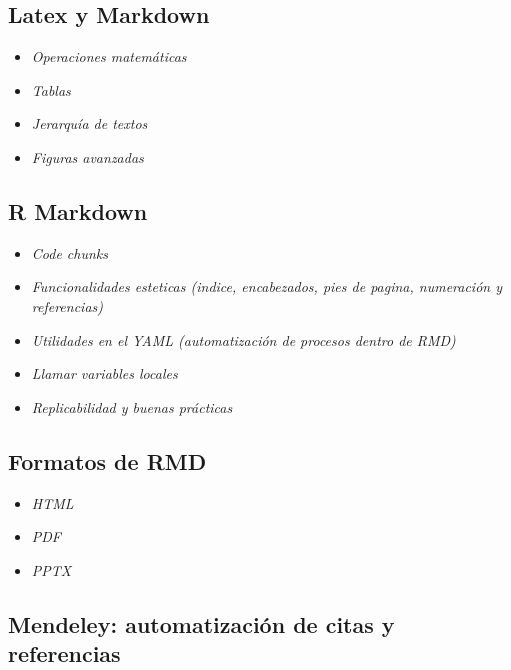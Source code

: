 \documentclass[11pt,]{article}
\begin{document}
\hypertarget{latex-y-markdown}{%
\subsection{Latex y Markdown}\label{latex-y-markdown}}

\begin{itemize}
\item
  \emph{Operaciones matemáticas}
\item
  \emph{Tablas}
\item
  \emph{Jerarquía de textos}
\item
  \emph{Figuras avanzadas}
\end{itemize}

\hypertarget{r-markdown}{%
\subsection{R Markdown}\label{r-markdown}}

\begin{itemize}
\item
  \emph{Code chunks}
\item
  \emph{Funcionalidades esteticas (indice, encabezados, pies de pagina,
  numeración y referencias)}
\item
  \emph{Utilidades en el YAML (automatización de procesos dentro de
  RMD)}
\item
  \emph{Llamar variables locales}
\item
  \emph{Replicabilidad y buenas prácticas}
\end{itemize}

\hypertarget{formatos-de-rmd}{%
\subsection{Formatos de RMD}\label{formatos-de-rmd}}

\begin{itemize}
\item
  \emph{HTML}
\item
  \emph{PDF}
\item
  \emph{PPTX}
\end{itemize}

\hypertarget{mendeley-automatizaciuxf3n-de-citas-y-referencias}{%
\subsection{Mendeley: automatización de citas y
referencias}\label{mendeley-automatizaciuxf3n-de-citas-y-referencias}}
\end{document}
